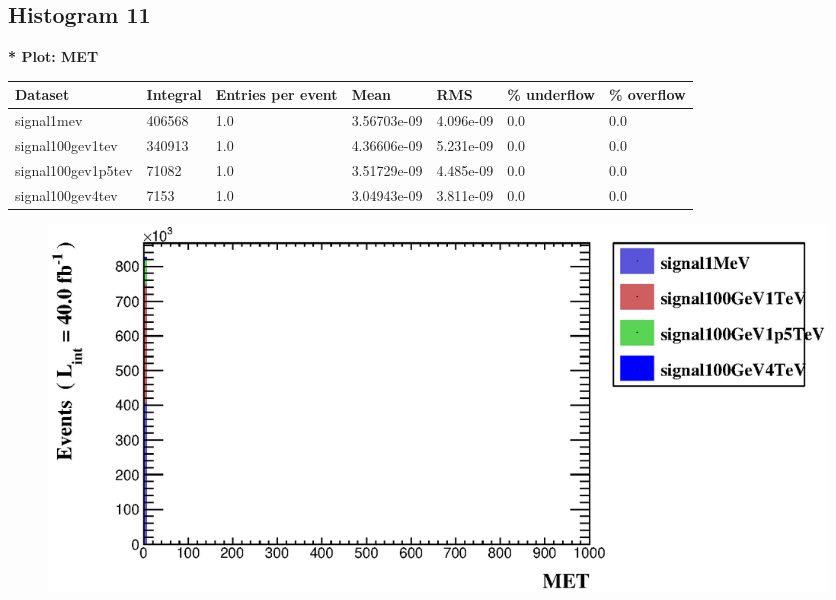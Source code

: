 \documentclass[a4paper, 10pt]{article}
\begin{document}
\subsection{ Histogram 11}

\textbf{* Plot: MET}\\
   \begin{table}[H]
  \begin{center}
    \begin{tabular}{|m{23.0mm}|m{23.0mm}|m{18.0mm}|m{19.0mm}|m{19.0mm}|m{19.0mm}|m{19.0mm}|}
      \hline
      {\cellcolor{yellow}         Dataset}& {\cellcolor{yellow}         Integral}& {\cellcolor{yellow}         Entries per event}& {\cellcolor{yellow}         Mean}& {\cellcolor{yellow}         RMS}& {\cellcolor{yellow}         \% underflow}& {\cellcolor{yellow}         \% overflow}\\
      \hline
      {\cellcolor{white}         signal1mev}& {\cellcolor{white}         406568}& {\cellcolor{white}         1.0}& {\cellcolor{white}         3.56703e-09}& {\cellcolor{white}         4.096e-09}& {\cellcolor{green}         0.0}& {\cellcolor{green}         0.0}\\
      \hline
      {\cellcolor{white}         signal100gev1tev}& {\cellcolor{white}         340913}& {\cellcolor{white}         1.0}& {\cellcolor{white}         4.36606e-09}& {\cellcolor{white}         5.231e-09}& {\cellcolor{green}         0.0}& {\cellcolor{green}         0.0}\\
      \hline
      {\cellcolor{white}         signal100gev1p5tev}& {\cellcolor{white}         71082}& {\cellcolor{white}         1.0}& {\cellcolor{white}         3.51729e-09}& {\cellcolor{white}         4.485e-09}& {\cellcolor{green}         0.0}& {\cellcolor{green}         0.0}\\
      \hline
      {\cellcolor{white}         signal100gev4tev}& {\cellcolor{white}         7153}& {\cellcolor{white}         1.0}& {\cellcolor{white}         3.04943e-09}& {\cellcolor{white}         3.811e-09}& {\cellcolor{green}         0.0}& {\cellcolor{green}         0.0}\\
\hline
    \end{tabular}
  \end{center}
\end{table}

\begin{figure}[H]
  \begin{center}
    \includegraphics[scale=0.45]{selection_10.eps}\\
\caption{   }
  \end{center}
\end{figure}
      \newpage
\end{document}
